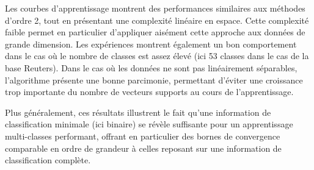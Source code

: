 \documentclass[twocolumn]{article}
\begin{document}
Les courbes d'apprentissage montrent des performances similaires aux méthodes d'ordre 2, tout en présentant une complexité linéaire en espace. 
Cette complexité faible permet en particulier d'appliquer aisément cette approche aux données de grande dimension. Les expériences montrent également un bon comportement dans le cas où le nombre de classes est assez élevé (ici 53 classes dans le cas de la base Reuters).  
Dans le cas où les données ne sont pas linéairement séparables, l'algorithme présente une bonne parcimonie, permettant d'éviter une croissance trop importante du nombre de vecteurs supports au cours de l'apprentissage.

Plus généralement, ces résultats illustrent le fait qu'une information de classification minimale (ici binaire) se révèle suffisante pour un apprentissage multi-classes performant, offrant en particulier des bornes de convergence comparable en ordre de grandeur à celles reposant sur une information de classification complète.



\end{document}
